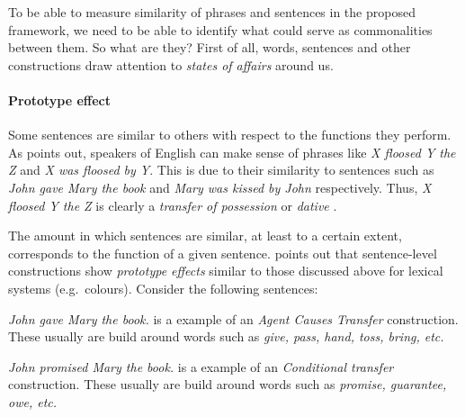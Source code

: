 \documentclass[11pt]{article}
\begin{document}
To be able to measure similarity of phrases and sentences in the proposed framework, we need to be able to identify what could serve as commonalities between them. So what are they? First of all, words, sentences and other constructions draw attention to \emph{states of affairs} around us. 

\paragraph{Prototype effect}

Some sentences are similar to others with respect to the functions they perform. As  points out, speakers of English can make sense of phrases like \textit{X floosed Y the Z} and \textit{X was floosed by Y}. This is due to their similarity to sentences such as \textit{John gave Mary the book} and \textit{Mary was kissed by John} respectively. Thus, \textit{X floosed Y the Z} is clearly a \emph{transfer of possession} or \emph{dative} \cite{bresnan2007predicting}.

The amount in which sentences are similar, at least to a certain extent, corresponds to the function of a given sentence.  points out that sentence-level constructions show \emph{prototype effects} similar to those discussed above for lexical systems (e.g.~colours). Consider the following sentences:
\begin{compactitem}
    \item \textit{John gave Mary the book.} is a example of an \emph{Agent Causes Transfer} construction. These usually are build around words such as \textit{give, pass, hand, toss, bring, etc.}
      \item \textit{John promised Mary the book.} is a example of an \emph{Conditional transfer} construction. These usually are build around words such as \textit{promise, guarantee, owe, etc.}
\end{compactitem}
\end{document}
